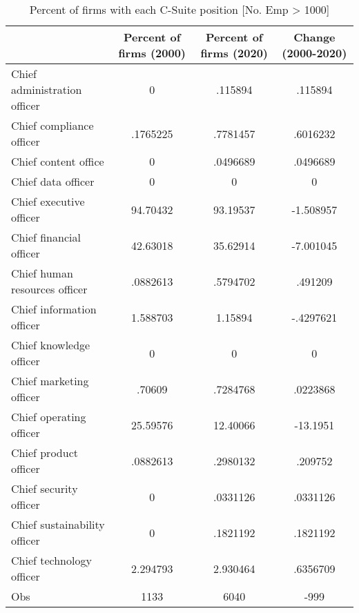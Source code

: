 \begin{table}[htbp]\centering
\caption{Percent of firms with each C-Suite position [No. Emp > 1000]\label{tab98}}
\begin{tabular}{l*{3}{c}}
\toprule
                    &Percent of firms (2000)&Percent of firms (2020)&Change (2000-2020)\\
\midrule
Chief administration officer&           0&     .115894&     .115894\\
Chief compliance officer&    .1765225&    .7781457&    .6016232\\
Chief content office&           0&    .0496689&    .0496689\\
Chief data officer  &           0&           0&           0\\
Chief executive officer&    94.70432&    93.19537&   -1.508957\\
Chief financial officer&    42.63018&    35.62914&   -7.001045\\
Chief human resources officer&    .0882613&    .5794702&     .491209\\
Chief information officer&    1.588703&     1.15894&   -.4297621\\
Chief knowledge officer&           0&           0&           0\\
Chief marketing officer&      .70609&    .7284768&    .0223868\\
Chief operating officer&    25.59576&    12.40066&    -13.1951\\
Chief product officer&    .0882613&    .2980132&     .209752\\
Chief security officer&           0&    .0331126&    .0331126\\
Chief sustainability officer&           0&    .1821192&    .1821192\\
Chief technology officer&    2.294793&    2.930464&    .6356709\\
Obs                 &        1133&        6040&        -999\\
\bottomrule
\end{tabular}
\end{table}
